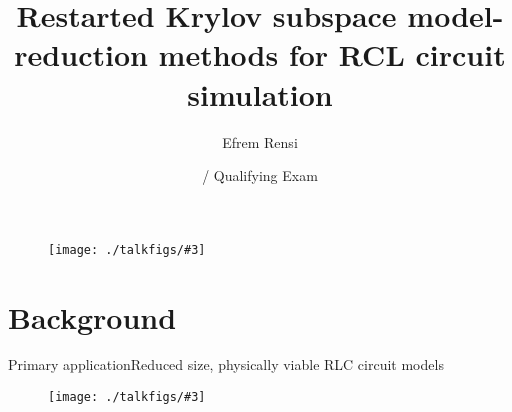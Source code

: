 \documentclass{beamer}
\title[Restarted Krylov for ROM] %
{Restarted Krylov subspace model-reduction methods for 
		RCL circuit simulation}
\author[]{Efrem Rensi}
\institute[E. Rensi]%
{
  GGAM, Department of Mathematics\\
  University of California, Davis
}
\date[Qual] %
{\formatdate{3}{6}{2009} / Qualifying Exam}
\theoremstyle{remark}
\newcommand{\putfig}[3][{}]{\texttt{[image: ./talkfigs/\#3]}} %
\begin{document}
\begin{frame}
  \titlepage
  \begin{figure}
  	     \centering
  	     	\putfig[{324 149}]{0.30}{IO.png}
     \end{figure}
\end{frame}

\section{Background}

\begin{comment}
\begin{frame}{Outline}
  \tableofcontents
\end{frame}
\end{comment}

\begin{frame}{Primary application}{Reduced size, physically viable RLC circuit models}
	 \begin{figure}
		 \centering
		 \putfig[{723 543}]{.85}{ttt.png}
	 \end{figure}
\end{frame}
\end{document}
